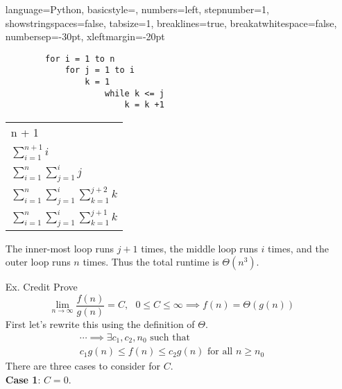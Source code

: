 \documentclass{article}
\begin{document}
\begin{enumerate}
          { %
              language=Python,
              basicstyle=\footnotesize,
              numbers=left,
              stepnumber=1,
              showstringspaces=false,
              tabsize=1,
              breaklines=true,
              breakatwhitespace=false,
              numbersep=-30pt,
              xleftmargin=-20pt
          }
          \setlength{\columnseprule}{0.1pt}
          \begin{multicols}{2}
              \begin{lstlisting}
        for i = 1 to n
            for j = 1 to i
                k = 1
                    while k <= j
                        k = k +1
        \end{lstlisting}
              \columnbreak
              \footnotesize
              \begin{tabular}{l}
                  n + 1                                                   \\
                  $\sum_{i=1}^{n+1}{i}$                                   \\
                  $\sum_{i=1}^{n}{\sum_{j=1}^{i}{j}}$                     \\
                  $\sum_{i=1}^{n}{\sum_{j=1}^{i}{\sum_{k=1}^{j + 2}{k}}}$ \\
                  $\sum_{i=1}^{n}{\sum_{j=1}^{i}{\sum_{k=1}^{j + 1}{k}}}$
              \end{tabular}
          \end{multicols}
          The inner-most loop runs \(j + 1\) times, the middle loop runs \(i\) times, and the outer loop runs \(n\) times. Thus the total runtime is \(\Theta(n^3)\).
    \item [Ex. Credit] Prove
          \begin{equation*}
              \lim_{n \to \infty} \frac{f(n)}{g(n)} = C, \text{ } 0 \leq C \leq \infty \implies f(n) = \Theta(g(n))
          \end{equation*}
          First let's rewrite this using the definition of \(\Theta\).
          \begin{align*}
              \cdots \implies \exists c_1, c_2, n_0 \text{ such that } \\
              c_1g(n) \leq f(n) \leq c_2g(n) \text{ for all } n \geq n_0
          \end{align*}
          There are three cases to consider for \(C\). \\
          \textbf{Case 1}: \(C = 0\). \\

\end{enumerate}
\end{document}
